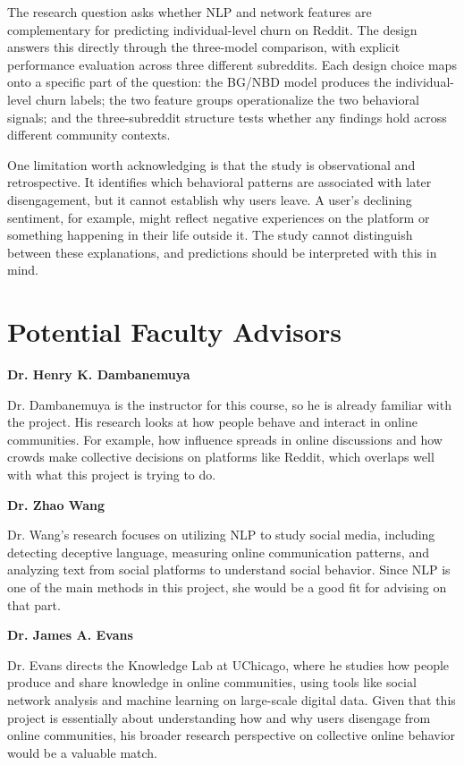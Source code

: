 \documentclass[12pt]{article}
\begin{document}
The research question asks whether NLP and network features are complementary for predicting individual-level churn on Reddit. The design answers this directly through the three-model comparison, with explicit performance evaluation across three different subreddits. Each design choice maps onto a specific part of the question: the BG/NBD model produces the individual-level churn labels; the two feature groups operationalize the two behavioral signals; and the three-subreddit structure tests whether any findings hold across different community contexts.

One limitation worth acknowledging is that the study is observational and retrospective. It identifies which behavioral patterns are associated with later disengagement, but it cannot establish why users leave. A user's declining sentiment, for example, might reflect negative experiences on the platform or something happening in their life outside it. The study cannot distinguish between these explanations, and predictions should be interpreted with this in mind.

\section*{Potential Faculty Advisors}

\textbf{Dr. Henry K. Dambanemuya}

Dr. Dambanemuya is the instructor for this course, so he is already familiar with the project. His research looks at how people behave and interact in online communities. For example, how influence spreads in online discussions and how crowds make collective decisions on platforms like Reddit, which overlaps well with what this project is trying to do.

\textbf{Dr. Zhao Wang}

Dr. Wang's research focuses on utilizing NLP to study social media, including detecting deceptive language, measuring online communication patterns, and analyzing text from social platforms to understand social behavior. Since NLP is one of the main methods in this project, she would be a good fit for advising on that part.

\textbf{Dr. James A. Evans}

Dr. Evans directs the Knowledge Lab at UChicago, where he studies how people produce and share knowledge in online communities, using tools like social network analysis and machine learning on large-scale digital data. Given that this project is essentially about understanding how and why users disengage from online communities, his broader research perspective on collective online behavior would be a valuable match.
\end{document}
